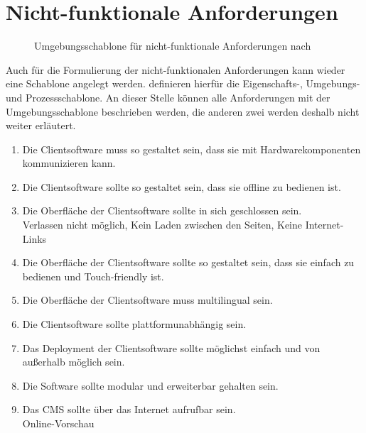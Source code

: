\section{Nicht-funktionale Anforderungen}
\label{sec:nicht-funktionale}

\begin{figure}
    \centering
    
    \caption{Umgebungsschablone für nicht-funktionale Anforderungen nach }
    \label{fig:schablone-umgebung}
\end{figure}

Auch für die Formulierung der nicht-funktionalen Anforderungen kann wieder eine Schablone angelegt werden.
 definieren hierfür die Eigenschafts-, Umgebungs- und Prozessschablone. An dieser Stelle
können alle Anforderungen mit der Umgebungsschablone beschrieben werden, die anderen zwei werden deshalb nicht
weiter erläutert.

\begin{enumerate}[label=NFA\arabic*]
	\item\label{nfa1} Die Clientsoftware muss so gestaltet sein, dass sie mit Hardwarekomponenten kommunizieren kann.
	\item\label{nfa2} Die Clientsoftware sollte so gestaltet sein, dass sie offline zu bedienen ist. 
  \item\label{nfa3} Die Oberfläche der Clientsoftware sollte in sich geschlossen sein.\\
  Verlassen nicht möglich, Kein Laden zwischen den Seiten, Keine Internet-Links
  \item\label{nfa4} Die Oberfläche der Clientsoftware sollte so gestaltet sein, dass sie einfach 
  zu bedienen und Touch-friendly ist.
  \item\label{nfa5} Die Oberfläche der Clientsoftware muss multilingual sein.
  \item\label{nfa6} Die Clientsoftware sollte plattformunabhängig sein.
  \item\label{nfa7} Das Deployment der Clientsoftware sollte möglichst einfach und von außerhalb möglich sein.
  \item\label{nfa8} Die Software sollte modular und erweiterbar gehalten sein.
  \item\label{nfa9} Das CMS sollte über das Internet aufrufbar sein.\\
  Online-Vorschau
\end{enumerate}
